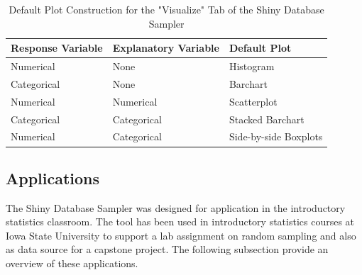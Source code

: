 \documentclass{article}\usepackage[]{graphicx}\usepackage[]{color}
\begin{document}
\begin{table}[H]
\centering
\begin{tabular}{lll}
\hline 
Response Variable & Explanatory Variable & Default Plot \\
\hline
Numerical & None & Histogram \\
Categorical & None & Barchart \\
Numerical & Numerical & Scatterplot \\
Categorical & Categorical & Stacked Barchart \\
Numerical & Categorical & Side-by-side Boxplots \\

\hline
\end{tabular}
\caption{Default Plot Construction for the "Visualize" Tab of the Shiny Database Sampler} 
\label{tab:defaultplottypes}
\end{table}


% 
% 

\vspace{.1in}

\subsection{Applications}
\label{Applications}

The Shiny Database Sampler was designed for application in the introductory statistics classroom.  The tool has been used in introductory statistics courses at Iowa State University to support a lab assignment on random sampling and also as data source for a capstone project. The following subsection provide an overview of these applications.
\end{document}
